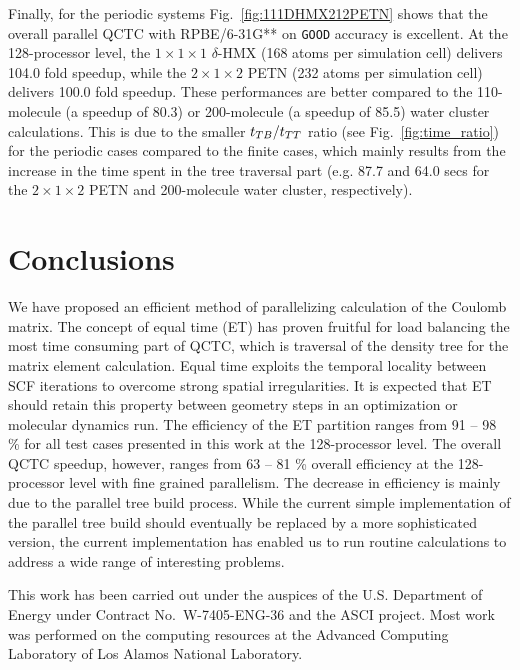\commentoutA{\documentclass[prl,aps,twocolumn,twocolumngrid,superbib]{revtex4}}
\begin{document}
Finally, for the periodic systems Fig.~\ref{fig:111DHMX212PETN} shows
that the overall parallel QCTC with RPBE/6-31G** on {\tt GOOD}
accuracy is excellent. At the 128-processor level, the $1\times
1\times 1$ $\delta$-HMX (168 atoms per simulation cell) delivers 104.0
fold speedup, while the $2\times 1 \times 2$ PETN (232 atoms per
simulation cell) delivers 100.0 fold speedup. These performances are
better compared to the 110-molecule (a speedup of 80.3) or
200-molecule (a speedup of 85.5) water cluster calculations. This is
due to the smaller $t_{TB}/t_{TT}$ ratio (see Fig.~\ref{fig:time_ratio})
for the periodic cases compared to the finite cases, which mainly
results from the increase in the time spent in the tree traversal part
(e.g. 87.7 and 64.0 secs for the $2\times 1 \times 2$ PETN and
200-molecule water cluster, respectively).

\section{Conclusions}
\label{conclusions}
We have proposed an efficient method of parallelizing calculation of
the Coulomb matrix. The concept of equal time (ET) has proven fruitful
for load balancing the most time consuming part of QCTC, which is
traversal of the density tree for the matrix element calculation.
Equal time exploits the temporal locality between SCF iterations to
overcome strong spatial irregularities. It is expected that ET should
retain this property between geometry steps in an optimization or
molecular dynamics run.  The efficiency of the ET partition ranges
from 91 -- 98 \% for all test cases presented in this work at the
128-processor level. The overall QCTC speedup, however, ranges from 63
-- 81 \% overall efficiency at the 128-processor level with fine
grained parallelism.  The decrease in efficiency is mainly due to the
parallel tree build process.  While the current simple implementation
of the parallel tree build should eventually be replaced by a more
sophisticated version, the current implementation has enabled us to
run routine calculations to address a wide range of interesting
problems\cite{CGan04C,CGan04A}.

\begin{acknowledgments}
This work has been carried out under the auspices of the
U.S. Department of Energy under Contract No.~W-7405-ENG-36 and the
ASCI project.  Most work was performed on the computing resources at
the Advanced Computing Laboratory of Los Alamos National Laboratory.
\end{acknowledgments}

 
\end{document}

